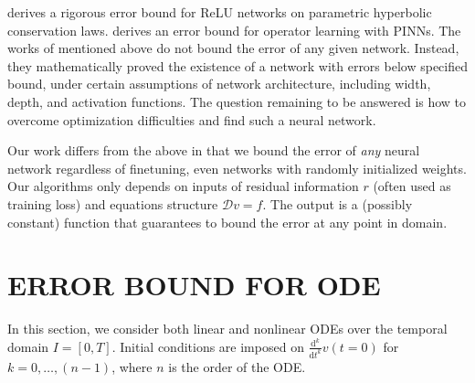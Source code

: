 \documentclass[accepted]{uai2023}
\begin{document}
    \cite{de2022errorhyperbolic} derives a rigorous error bound for ReLU networks on parametric hyperbolic conservation laws.
    \cite{de2022errorkolmogorov} 
    \cite{de2022generic} derives an error bound for operator learning with PINNs.
    The works of \citeauthor{de2022errorhyperbolic} mentioned above do not bound the error of any given network.
    Instead, they mathematically proved the existence of a network with errors below specified bound, under certain assumptions of network architecture, including width, depth, and activation functions. 
    The question remaining to be answered is how to overcome optimization difficulties and find such a neural network.

    Our work differs from the above in that we bound the error of \textit{any} neural network regardless of finetuning, even networks with randomly initialized weights.
    Our algorithms only depends on inputs of residual information $r$ (often used as training loss) and equations structure $\mathcal{D} v = f$.
    The output is a (possibly constant) function that guarantees to bound the error at any point in domain.

\section{ERROR BOUND FOR ODE}  \label{section:error-bound-for-ode}
    In this section, we consider both linear and nonlinear ODEs over the temporal domain $I=[0, T]$. 
    Initial conditions are imposed on $\frac{\mathrm{d}^k}{\mathrm{d}t^k}v(t=0)$ for $k = 0, \dots, (n - 1)$, where $n$ is the order of the ODE.
\end{document}
